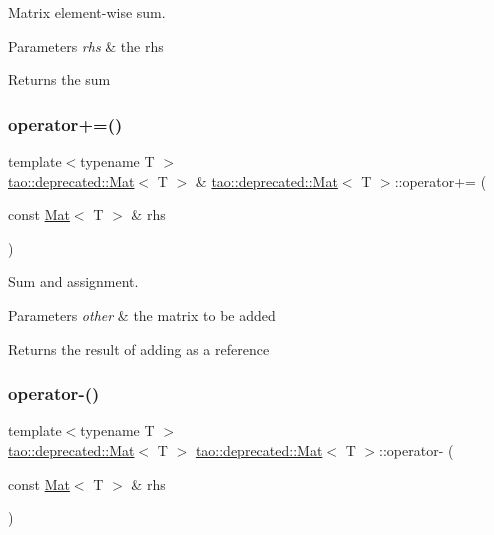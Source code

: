 Matrix element-\/wise sum. 


\begin{DoxyParams}{Parameters}
{\em rhs} & the rhs \\
\hline
\end{DoxyParams}
\begin{DoxyReturn}{Returns}
the sum 
\end{DoxyReturn}
\mbox{\label{classtao_1_1deprecated_1_1_mat_a8a904cf83b7df96ef3dbcaf3adfed021}} 
\subsubsection{\texorpdfstring{operator+=()}{operator+=()}}
{\footnotesize\ttfamily template$<$typename T $>$ \\
\mbox{\hyperlink{classtao_1_1deprecated_1_1_mat}{tao\+::deprecated\+::\+Mat}}$<$ T $>$ \& \mbox{\hyperlink{classtao_1_1deprecated_1_1_mat}{tao\+::deprecated\+::\+Mat}}$<$ T $>$\+::operator+= (\begin{DoxyParamCaption}\item[{const \mbox{\hyperlink{classtao_1_1deprecated_1_1_mat}{Mat}}$<$ T $>$ \&}]{rhs }\end{DoxyParamCaption})}



Sum and assignment. 


\begin{DoxyParams}{Parameters}
{\em other} & the matrix to be added \\
\hline
\end{DoxyParams}
\begin{DoxyReturn}{Returns}
the result of adding as a reference 
\end{DoxyReturn}
\mbox{\label{classtao_1_1deprecated_1_1_mat_a7a015cf22c258251c83fa028b34ded1e}} 
\subsubsection{\texorpdfstring{operator-\/()}{operator-()}\hspace{0.1cm}{\footnotesize\ttfamily [1/2]}}
{\footnotesize\ttfamily template$<$typename T $>$ \\
\mbox{\hyperlink{classtao_1_1deprecated_1_1_mat}{tao\+::deprecated\+::\+Mat}}$<$ T $>$ \mbox{\hyperlink{classtao_1_1deprecated_1_1_mat}{tao\+::deprecated\+::\+Mat}}$<$ T $>$\+::operator-\/ (\begin{DoxyParamCaption}\item[{const \mbox{\hyperlink{classtao_1_1deprecated_1_1_mat}{Mat}}$<$ T $>$ \&}]{rhs }\end{DoxyParamCaption})}



